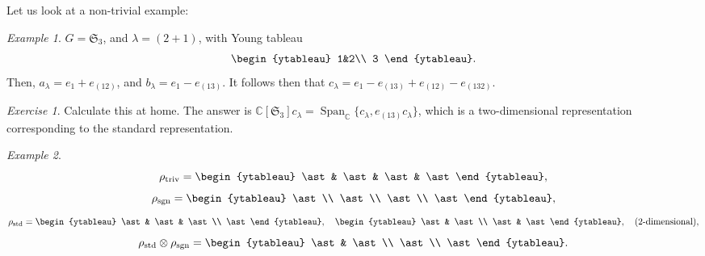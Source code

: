 \documentclass[a4paper]{report}
\theoremstyle{definition}
\theoremstyle{remark}
\theoremstyle{proposition}
\theoremstyle{conjecture}
\theoremstyle{lemma}
\theoremstyle{corollary}
\theoremstyle{exercise}
\newtheorem{exercise}{Exercise}
\theoremstyle{example}
\newtheorem{example}{Example}
\newcommand{\C}{\mathbb{C}}
\newcommand{\on}{\operatorname}
\begin{document}
Let us look at a non-trivial example:
\begin{example}
    $G = \mathfrak{S}_3$, and $\lambda = (2+1)$, with 
    Young tableau
    $$\begin{ytableau}
        1&2\\
        3
    \end{ytableau}.$$
    Then, $a_\lambda = e_1 + e_{(12)}$, and $b_\lambda = e_1-e_{(13)}$.
    It follows then that 
    $c_\lambda = e_1-e_{(13)} + e_{(12)} - e_{(132)}$.
    \begin{exercise}
        Calculate this at home. The answer is $\C[\mathfrak{S}_3]c_\lambda = \on{Span}_\C \lbrace c_\lambda, e_{(13)}c_\lambda\rbrace$, which is a 
        two-dimensional representation corresponding to the standard 
        representation.
    \end{exercise}
\end{example}

\begin{example}
    $$\rho_{\on{triv}} = \begin{ytableau}
        \ast & \ast & \ast & \ast
    \end{ytableau},$$
    $$\rho_{\on{sgn}} = \begin{ytableau}
        \ast\\
        \ast\\
        \ast\\
        \ast
    \end{ytableau},$$
    $$\rho_{\on{std}} = \begin{ytableau}
        \ast & \ast & \ast\\
        \ast 
        \end{ytableau},\quad \begin{ytableau}
        \ast & \ast\\
        \ast & \ast 
    \end{ytableau},\quad \text{($2$-dimensional)},$$
    $$\rho_{\on{std}}\otimes\rho_{\on{sgn}} = \begin{ytableau}
        \ast & \ast\\
        \ast\\
        \ast
    \end{ytableau}.$$
\end{example}
\end{document}
